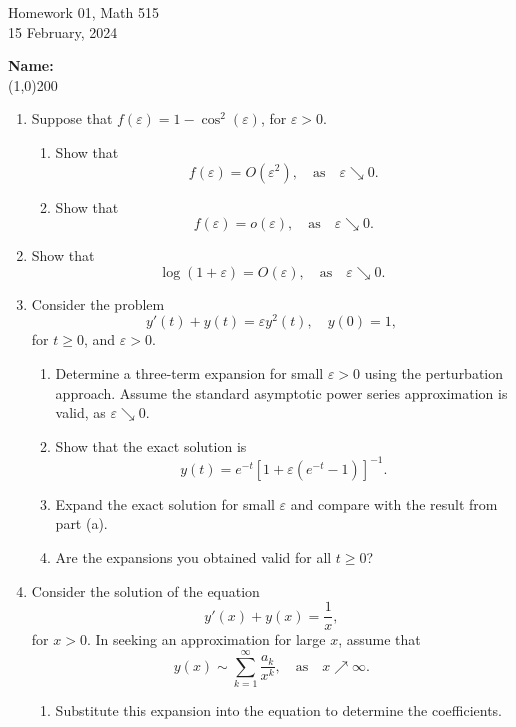 \documentclass[12pt]{letter}
\begin{document}
    \begin{center}
{\LARGE\sc Homework 01, Math 515 \\ 15 February, 2024}
	\end{center}
	
	\bigskip

{\Large\bf\sc Name:}
	\\
    \bigskip
    \line(1,0){200}
    \\
	\begin{enumerate}
	
	\item
Suppose that $f(\varepsilon) = 1-\cos^2(\varepsilon)$, for $\varepsilon >0$. 
	\begin{enumerate}
	\item
Show that
	\[
f(\varepsilon) = O(\varepsilon^2), \quad \mbox{as}\quad\varepsilon\searrow 0.	
	\]
	\item
Show that
	\[
f(\varepsilon) = o(\varepsilon), \quad \mbox{as}\quad\varepsilon\searrow 0.	
	\]
	\end{enumerate}
	
	\item
Show that
	\[
\log(1+\varepsilon) = O(\varepsilon)	, \quad \mbox{as}\quad\varepsilon\searrow 0.
	\]

	\item
Consider the problem
	\[
y'(t) + y(t) = \varepsilon y^2(t), \quad y(0) = 1,	
	\]
for $t\ge 0$, and $\varepsilon >0$.
	\begin{enumerate}
	\item
Determine a three-term expansion for small $\varepsilon>0$ using the perturbation approach. Assume the standard asymptotic power series approximation is valid, as $\varepsilon\searrow 0$.

	\item
Show that the exact solution is
	\[
y(t) = e^{-t}\left[ 1+ \varepsilon(e^{-t}-1)\right]^{-1}.	
	\]
	
	\item
Expand the exact solution for small $\varepsilon$ and compare with the result from part (a).

	\item
Are the expansions you obtained valid for all $t\ge 0$?

	\end{enumerate}
	
	\item
Consider the solution of the equation
	\[
y'(x) + y(x) = \frac{1}{x},	
	\]
for $x>0$. In seeking an approximation for large $x$, assume that 
	\[
y(x) \sim \sum_{k=1}^\infty  \frac{a_k}{x^k}, \quad \mbox{as} \quad  x\nearrow\infty.	
	\]
	\begin{enumerate}
	\item
Substitute this expansion into the equation to determine the coefficients. 


\end{enumerate}
\end{enumerate}
\end{document}
